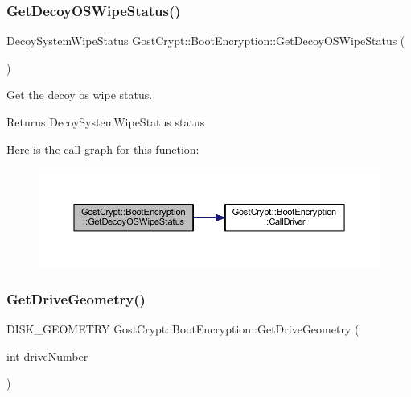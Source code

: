 \subsubsection{\texorpdfstring{Get\+Decoy\+O\+S\+Wipe\+Status()}{GetDecoyOSWipeStatus()}}
{\footnotesize\ttfamily Decoy\+System\+Wipe\+Status Gost\+Crypt\+::\+Boot\+Encryption\+::\+Get\+Decoy\+O\+S\+Wipe\+Status (\begin{DoxyParamCaption}{ }\end{DoxyParamCaption})}



Get the decoy os wipe status. 

\begin{DoxyReturn}{Returns}
Decoy\+System\+Wipe\+Status status 
\end{DoxyReturn}
Here is the call graph for this function\+:
\nopagebreak
\begin{figure}[H]
\begin{center}
\leavevmode
\includegraphics[width=350pt]{class_gost_crypt_1_1_boot_encryption_a32a8979f6ea15a11e10bc26d19df9cc5_cgraph}
\end{center}
\end{figure}
\mbox{\label{class_gost_crypt_1_1_boot_encryption_aacfb758834e184a992d9f6274d77cc2a}} 
\subsubsection{\texorpdfstring{Get\+Drive\+Geometry()}{GetDriveGeometry()}}
{\footnotesize\ttfamily D\+I\+S\+K\+\_\+\+G\+E\+O\+M\+E\+T\+RY Gost\+Crypt\+::\+Boot\+Encryption\+::\+Get\+Drive\+Geometry (\begin{DoxyParamCaption}\item[{int}]{drive\+Number }\end{DoxyParamCaption})\hspace{0.3cm}{\ttfamily [protected]}}



